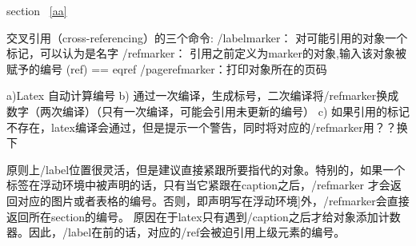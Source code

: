 \documentclass[10pt,a4paper]{article}
\begin{document}
\begin{CJK*}{UTF8}{gbsn}
section~ \ref{aa}


交叉引用（cross-referencing）的三个命令:
/label{marker}： 对可能引用的对象一个标记，可以认为是名字
/ref{marker}： 引用之前定义为marker的对象,输入该对象被赋予的编号
(ref) == eqref
/pageref{marker}：打印对象所在的页码

a)Latex 自动计算编号 b) 通过一次编译，生成标号，二次编译将/ref{marker}换成数字（两次编译）（只有一次编译，可能会引用未更新的编号） c) 如果引用的标记不存在，latex编译会通过，但是提示一个警告，同时将对应的/ref{marker}用？？换下

原则上/label位置很灵活，但是建议直接紧跟所要指代的对象。特别的，如果一个标签在浮动环境中被声明的话，只有当它紧跟在caption{}之后，/ref{marker} 才会返回对应的图片或者表格的编号。否则，即声明写在浮动环境]外，/ref{marker}会直接返回所在section的编号。
原因在于latex只有遇到/caption之后才给对象添加计数器。因此，/label在前的话，对应的/ref会被迫引用上级元素的编号。




















\end{CJK*}
\end{document}
